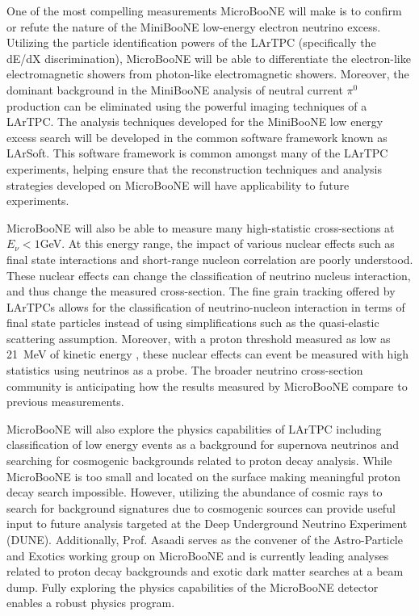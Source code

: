 One of the most compelling measurements MicroBooNE will make is to confirm or refute the nature of the MiniBooNE low-energy electron neutrino excess. Utilizing the particle identification powers of the LArTPC (specifically the dE/dX discrimination), MicroBooNE will be able to differentiate the electron-like electromagnetic showers from photon-like electromagnetic showers. Moreover, the dominant background in the MiniBooNE analysis of neutral current $\pi^{0}$ production can be eliminated using the powerful imaging techniques of a LArTPC. The analysis techniques developed for the MiniBooNE low energy excess search will be developed in the common software framework known as LArSoft. This software framework is common amongst many of the LArTPC experiments, helping ensure that the reconstruction techniques and analysis strategies developed on MicroBooNE will have applicability to future experiments.

MicroBooNE will also be able to measure many high-statistic cross-sections at $E_{\nu} < 1$GeV. At this energy range, the impact of various nuclear effects such as final state interactions and short-range nucleon correlation are poorly understood. These nuclear effects can change the classification of neutrino nucleus interaction, and thus change the measured cross-section. The fine grain tracking offered by LArTPCs allows for the classification of neutrino-nucleon interaction in terms of final state particles instead of using simplifications such as the quasi-elastic scattering assumption. Moreover, with a proton threshold measured as low as 21~MeV of kinetic energy \cite{Argoneut}, these nuclear effects can event be measured with high statistics using neutrinos as a probe. The broader neutrino cross-section community is anticipating how the results measured by MicroBooNE compare to previous measurements.

MicroBooNE will also explore the physics capabilities of LArTPC including classification of low energy events as a background for supernova neutrinos and searching for cosmogenic backgrounds related to proton decay analysis. While MicroBooNE is too small and located on the surface making meaningful proton decay search impossible. However, utilizing the abundance of cosmic rays to search for background signatures due to cosmogenic sources can provide useful input to future analysis targeted at the Deep Underground Neutrino Experiment (DUNE). Additionally, Prof. Asaadi serves as the convener of the Astro-Particle and Exotics working group on MicroBooNE and is currently leading analyses related to proton decay backgrounds and exotic dark matter searches at a beam dump. Fully exploring the physics capabilities of the MicroBooNE detector enables a robust physics program. 

